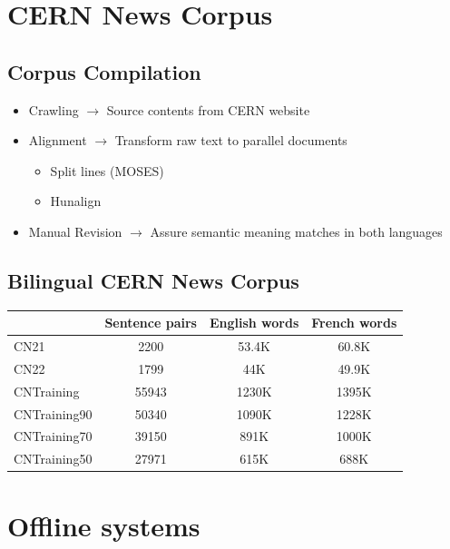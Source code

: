 \documentclass[landscape]{article}
\begin{document}
\cp
\section{CERN News Corpus}
\subsection*{Corpus Compilation}
\begin{itemize}
    \item{Crawling $\to$ Source contents from CERN website}
    \item{Alignment $\to$ Transform raw text to parallel documents}
        \begin{itemize}
            \item{Split lines (MOSES)}
            \item{Hunalign}
        \end{itemize}
    \item{Manual Revision $\to$ Assure semantic meaning matches in both languages}
\end{itemize}



\subsection*{Bilingual CERN News Corpus}
\begin{table}[ht]
\centering
\begin{tabular}{l|c|c|c}
& Sentence pairs & English words & French words \\
\hline
    CN21 & 2200 & 53.4K & 60.8K \\
    CN22 & 1799 & 44K & 49.9K \\
\hline
    CNTraining & 55943 & 1230K & 1395K \\
    CNTraining90 & 50340 & 1090K & 1228K \\
    CNTraining70 & 39150 & 891K & 1000K \\
    CNTraining50 & 27971 & 615K & 688K \\
\hline

\end{tabular}
\label{table:cnstats}
\end{table}

\cp
\section{Offline systems}
\vspace*{10mm}
\end{document}
